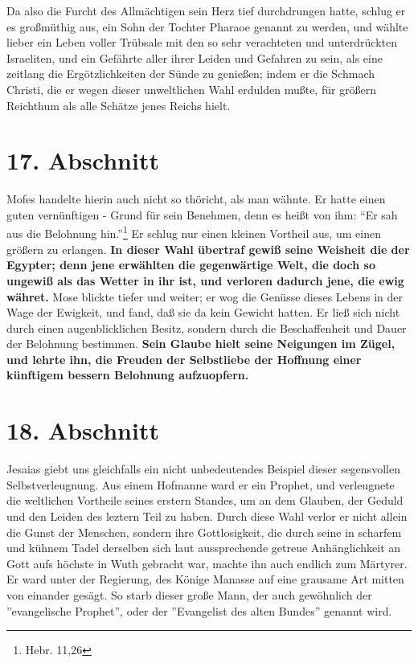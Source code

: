 Da also die Furcht des Allmächtigen sein Herz tief durchdrungen hatte, schlug er
es großmüthig aus, ein Sohn der Tochter Pharaoe genannt zu werden, und wählte
lieber ein Leben voller Trübsale mit den so sehr verachteten und unterdrückten
Israeliten, und ein Gefährte aller ihrer Leiden und Gefahren zu sein, als eine
zeitlang die Ergötzlichkeiten der Sünde zu genießen; indem er die Schmach
Christi, die er wegen dieser unweltlichen Wahl erdulden mußte, für größern
Reichthum als alle Schätze jenes Reichs hielt.

\section{17. Abschnitt} \label{kap4_ab17}

Mofes handelte hierin auch nicht so thöricht, als man wähnte. Er hatte einen
guten vernünftigen - Grund für sein Benehmen, denn es heißt von ihm: "`Er sah
aus die Belohnung hin."'\footnote{Hebr. 11,26} Er schlug nur einen kleinen
Vortheil aus, um einen größern zu erlangen. \textbf{In dieser Wahl übertraf gewiß seine
Weisheit die der Egypter; denn jene erwählten die gegenwärtige Welt, die doch so
ungewiß als das Wetter in ihr ist, und verloren dadurch jene, die ewig währet.}
Mose blickte tiefer und weiter; er wog die Genüsse dieses Lebens in der Wage der
Ewigkeit, und fand, daß sie da kein Gewicht hatten. Er ließ sich nicht durch
einen augenblicklichen Besitz, sondern durch die Beschaffenheit und Dauer der
Belohnung bestimmen. \textbf{Sein Glaube hielt seine Neigungen im Zügel, und lehrte ihn,
die Freuden der Selbstliebe der Hoffnung einer künftigem bessern Belohnung
aufzuopfern.}

\section{18. Abschnitt} \label{kap4_ab18}

Jesaias giebt uns gleichfalls ein nicht unbedeutendes Beispiel dieser
segensvollen Selbstverleugnung. Aus einem Hofmanne ward er ein Prophet, und
verleugnete die weltlichen Vortheile seines erstern Standes, um an dem Glauben,
der Geduld und den Leiden des leztern Teil zu haben. Durch diese Wahl verlor er
nicht allein die Gunst der Menschen, sondern ihre Gottlosigkeit, die durch seine
in scharfem und kühnem Tadel derselben sich laut aussprechende getreue
Anhänglichkeit an Gott aufs höchste in Wuth gebracht war, machte ihn auch
endlich zum Märtyrer. Er ward unter der Regierung, des Könige Manasse auf eine
grausame Art mitten von einander gesägt. So starb dieser große Mann, der auch
gewöhnlich der ''evangelische Prophet'', oder der ''Evangelist des alten
Bundes'' genannt wird.

